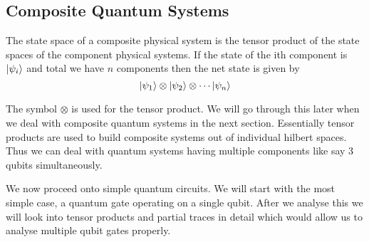 \subsection{Composite Quantum Systems}
\begin{postulate}
The state space of a composite physical system is the tensor product
of the state spaces of the component physical systems. If the state of the ith component is $\ket{\psi_i}$ and total we have $n$ components then the net state is given by 
$$ \ket{\psi_1} \otimes \ket{\psi_2} \otimes \cdots \ket{\psi_n}$$
\end{postulate}

The symbol $\otimes$ is used for the tensor product. We will go through this later when we deal with composite quantum systems in the next section. Essentially tensor products are used to build composite systems out of individual hilbert spaces. Thus we can deal with quantum systems having multiple components like say 3 qubits simultaneously.

We now proceed onto simple quantum circuits. We will start with the most simple case, a quantum gate operating on a single qubit. After we analyse this we will look into tensor products and partial traces in detail which would allow us to analyse multiple qubit gates properly.

\clearpage